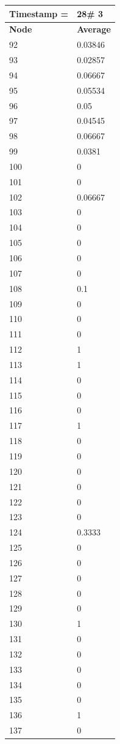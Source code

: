 \begin{tabular}{|l||l|}
\hline
\textbf{Timestamp =} & \textbf{28}\# 3\\\hline
	\textbf{Node} & \textbf{Average} \\ \hline
\hline
	92 & 0.03846 \\ \hline
	93 & 0.02857 \\ \hline
	94 & 0.06667 \\ \hline
	95 & 0.05534 \\ \hline
	96 & 0.05 \\ \hline
	97 & 0.04545 \\ \hline
	98 & 0.06667 \\ \hline
	99 & 0.0381 \\ \hline
	100 & 0 \\ \hline
	101 & 0 \\ \hline
	102 & 0.06667 \\ \hline
	103 & 0 \\ \hline
	104 & 0 \\ \hline
	105 & 0 \\ \hline
	106 & 0 \\ \hline
	107 & 0 \\ \hline
	108 & 0.1 \\ \hline
	109 & 0 \\ \hline
	110 & 0 \\ \hline
	111 & 0 \\ \hline
	112 & 1 \\ \hline
	113 & 1 \\ \hline
	114 & 0 \\ \hline
	115 & 0 \\ \hline
	116 & 0 \\ \hline
	117 & 1 \\ \hline
	118 & 0 \\ \hline
	119 & 0 \\ \hline
	120 & 0 \\ \hline
	121 & 0 \\ \hline
	122 & 0 \\ \hline
	123 & 0 \\ \hline
	124 & 0.3333 \\ \hline
	125 & 0 \\ \hline
	126 & 0 \\ \hline
	127 & 0 \\ \hline
	128 & 0 \\ \hline
	129 & 0 \\ \hline
	130 & 1 \\ \hline
	131 & 0 \\ \hline
	132 & 0 \\ \hline
	133 & 0 \\ \hline
	134 & 0 \\ \hline
	135 & 0 \\ \hline
	136 & 1 \\ \hline
	137 & 0 \\ \hline
\end{tabular}

